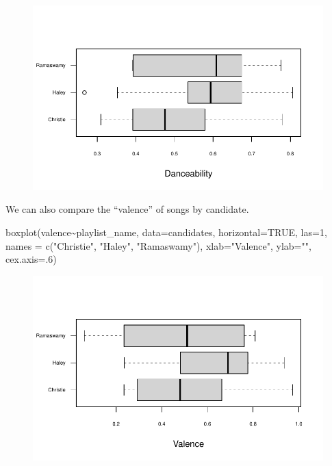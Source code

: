 \documentclass[
  letterpaper,
  DIV=11,
  numbers=noendperiod]{scrreprt}
\newenvironment{Shaded}{\begin{snugshade}}{\end{snugshade}}
\newcommand{\AttributeTok}[1]{\textcolor[rgb]{0.40,0.45,0.13}{#1}}
\newcommand{\ConstantTok}[1]{\textcolor[rgb]{0.56,0.35,0.01}{#1}}
\newcommand{\DecValTok}[1]{\textcolor[rgb]{0.68,0.00,0.00}{#1}}
\newcommand{\FunctionTok}[1]{\textcolor[rgb]{0.28,0.35,0.67}{#1}}
\newcommand{\NormalTok}[1]{\textcolor[rgb]{0.00,0.23,0.31}{#1}}
\newcommand{\SpecialCharTok}[1]{\textcolor[rgb]{0.37,0.37,0.37}{#1}}
\newcommand{\StringTok}[1]{\textcolor[rgb]{0.13,0.47,0.30}{#1}}
\begin{document}
\begin{figure}[H]

{\centering \includegraphics{11-TextasData_files/figure-pdf/unnamed-chunk-29-1.pdf}

}

\end{figure}

We can also compare the ``valence'' of songs by candidate.

\begin{Shaded}
\begin{Highlighting}[]
\FunctionTok{boxplot}\NormalTok{(valence}\SpecialCharTok{\textasciitilde{}}\NormalTok{playlist\_name, }\AttributeTok{data=}\NormalTok{candidates, }\AttributeTok{horizontal=}\ConstantTok{TRUE}\NormalTok{, }\AttributeTok{las=}\DecValTok{1}\NormalTok{, }
        \AttributeTok{names =} \FunctionTok{c}\NormalTok{(}\StringTok{"Christie"}\NormalTok{, }\StringTok{"Haley"}\NormalTok{,}
                                                                                \StringTok{"Ramaswamy"}\NormalTok{), }
        \AttributeTok{xlab=}\StringTok{"Valence"}\NormalTok{, }\AttributeTok{ylab=}\StringTok{""}\NormalTok{,}
        \AttributeTok{cex.axis=}\NormalTok{.}\DecValTok{6}\NormalTok{)}
\end{Highlighting}
\end{Shaded}

\begin{figure}[H]

{\centering \includegraphics{11-TextasData_files/figure-pdf/unnamed-chunk-30-1.pdf}

}

\end{figure}
\end{document}
